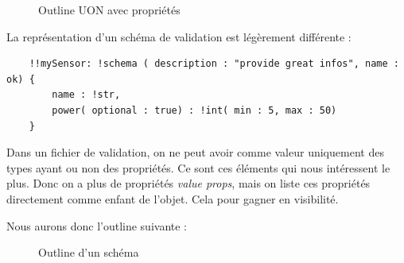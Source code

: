 \documentclass[
    iict, %
    il, %
]{heig-tb}
\begin{document}
\begin{figure}[!h]
    \begin{center}
    \end{center}
    \caption[Outline UON avec propriétés]{\label{uon-payload-outline-with-properties} Outline UON avec propriétés}
\end{figure}

La représentation d'un schéma de validation est légèrement différente :

\begin{lstlisting}
    !!mySensor: !schema ( description : "provide great infos", name : ok) {
        name : !str,
        power( optional : true) : !int( min : 5, max : 50)
    }
\end{lstlisting}

Dans un fichier de validation, on ne peut avoir comme valeur uniquement des types ayant ou non des propriétés. Ce sont ces éléments qui nous intéressent le plus.
Donc on a plus de propriétés \emph{value props}, mais on liste ces propriétés directement comme enfant de l'objet. Cela pour gagner en visibilité.

Nous aurons donc l'outline suivante :

\begin{figure}[!h]
    \begin{center}
    \end{center}
    \caption[Outline d'un schéma]{\label{uon-schema-outline} Outline d'un schéma}
\end{figure}
\end{document}
